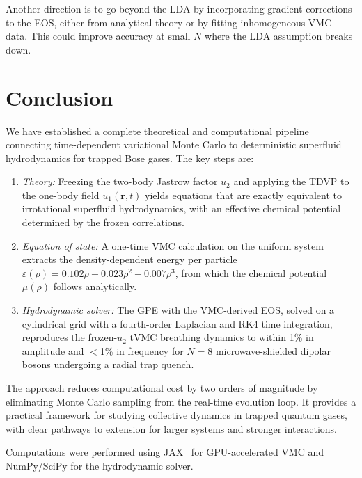 \documentclass[twocolumn,superscriptaddress,aps,pra,longbibliography]{revtex4-2}
\newcommand{\br}{\mathbf{r}}
\begin{document}
Another direction is to go beyond the LDA by incorporating gradient
corrections to the EOS, either from analytical theory or by fitting
inhomogeneous VMC data.  This could improve accuracy at small $N$ where
the LDA assumption breaks down.

\section{Conclusion}
\label{sec:conclusion}

We have established a complete theoretical and computational pipeline
connecting time-dependent variational Monte Carlo to deterministic
superfluid hydrodynamics for trapped Bose gases.  The key steps are:

\begin{enumerate}
\item \emph{Theory:} Freezing the two-body Jastrow factor $u_2$ and
applying the TDVP to the one-body field $u_1(\br,t)$ yields equations
that are exactly equivalent to irrotational superfluid hydrodynamics,
with an effective chemical potential determined by the frozen correlations.

\item \emph{Equation of state:} A one-time VMC calculation on the uniform
system extracts the density-dependent energy per particle
$\varepsilon(\rho) = 0.102\rho + 0.023\rho^2 - 0.007\rho^3$, from
which the chemical potential $\mu(\rho)$ follows analytically.

\item \emph{Hydrodynamic solver:} The GPE with the VMC-derived EOS,
solved on a cylindrical grid with a fourth-order Laplacian and RK4
time integration, reproduces the frozen-$u_2$ tVMC breathing dynamics
to within 1\% in amplitude and $<$1\% in frequency for $N=8$
microwave-shielded dipolar bosons undergoing a radial trap quench.
\end{enumerate}

The approach reduces computational cost by two orders of magnitude by
eliminating Monte Carlo sampling from the real-time evolution loop.
It provides a practical framework for studying collective dynamics in
trapped quantum gases, with clear pathways to extension for larger
systems and stronger interactions.

\begin{acknowledgments}
Computations were performed using JAX~\cite{Bradbury2018} for
GPU-accelerated VMC and NumPy/SciPy for the hydrodynamic solver.
\end{acknowledgments}


\end{document}
